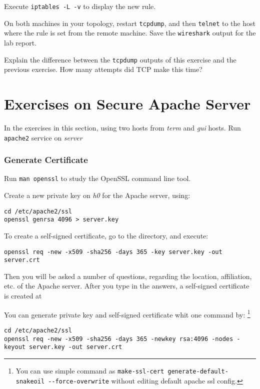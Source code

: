 \documentclass{../UTNetLab}
\begin{document}
    Execute \lstinline{iptables -L -v} to display the new rule.

    On both machines in your topology, restart \lstinline{tcpdump}, and then \lstinline{telnet} to the host where the rule is set from the remote machine.
    Save the \lstinline{wireshark} output for the lab report.
    
    \begin{report}
    \item Explain the difference between the \lstinline{tcpdump} outputs of this exercise and the previous exercise.
    How many attempts did {TCP} make this time?
    \end{report}

\part{Exercises on Secure Apache Server}
    In the exercises in this section, using two hosts from \textit{term} and \textit{gui} hosts.
    Run \lstinline{apache2} service on \textit{server}

\section{Generate Certificate}
    Run \lstinline{man openssl} to study the OpenSSL command line tool.

    Create a new private key on \textit{h0} for the Apache server, using:
    \begin{lstlisting}
cd /etc/apache2/ssl
openssl genrsa 4096 > server.key
    \end{lstlisting}
    To create a self-signed certificate, go to the  directory, and execute:
    \begin{lstlisting}
openssl req -new -x509 -sha256 -days 365 -key server.key -out server.crt
    \end{lstlisting}
    Then you will be asked a number of questions, regarding the location, affiliation, etc.
    of the Apache server.
    After you type in the answers, a self-signed certificate is created at 

    You can generate private key and self-signed certificate whit one command by:
    \footnote{You can use simple command as \lstinline{make-ssl-cert generate-default-snakeoil --force-overwrite} without editing default apache ssl config.}
    \begin{lstlisting}
cd /etc/apache2/ssl
openssl req -new -x509 -sha256 -days 365 -newkey rsa:4096 -nodes -keyout server.key -out server.crt
    \end{lstlisting}
\end{document}
